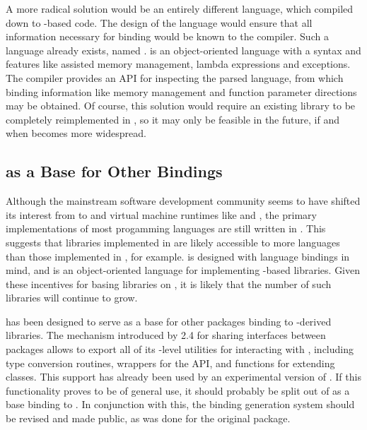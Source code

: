 \documentclass[article]{jss}
\begin{document}
A more radical solution would be an entirely different language, which
compiled down to -based  code. The design of
the
language would ensure that all information necessary for binding would
be known to the compiler. Such a language already exists, named
 \citep{vala}. 
 is an object-oriented language with
a  syntax and features like assisted memory management,
lambda expressions and 
exceptions. The  compiler provides an API for
inspecting
the parsed language, from which binding information like memory
management
and function parameter directions may be obtained. Of course, this
solution would require an existing library to be completely
reimplemented in
, so it may only be feasible in the future, if and when
 becomes more widespread.

\subsection[RGtk2 as a Base for Other GObject Bindings]{ as
a Base for Other  Bindings}

Although the mainstream software development community seems to have
shifted its interest from  to  and virtual
machine runtimes like  and , the primary
implementations of most progamming languages are still written in
. This suggests that libraries implemented in 
are likely accessible to more languages than those implemented in
, for example.  is designed with language
bindings in mind, and  is an object-oriented language
for implementing -based libraries.  Given these
incentives for basing libraries on , it is likely that
the number of such libraries will continue to grow.

 has been designed to serve as a base for other
packages binding to -derived libraries. The mechanism
introduced
by  2.4 for sharing  interfaces between
packages allows
 to export all of its -level utilities for 
interacting with , including type conversion routines,
wrappers
for the  API, and functions for extending 
classes.
This support has already been used by an experimental version of
\citep{ggobi-beta}. If this functionality proves to be of general use, 
it should probably be split out of  as a base binding to
.
In conjunction with this, the binding generation system should be
revised
and made public, as was done for the original  package.
\end{document}
